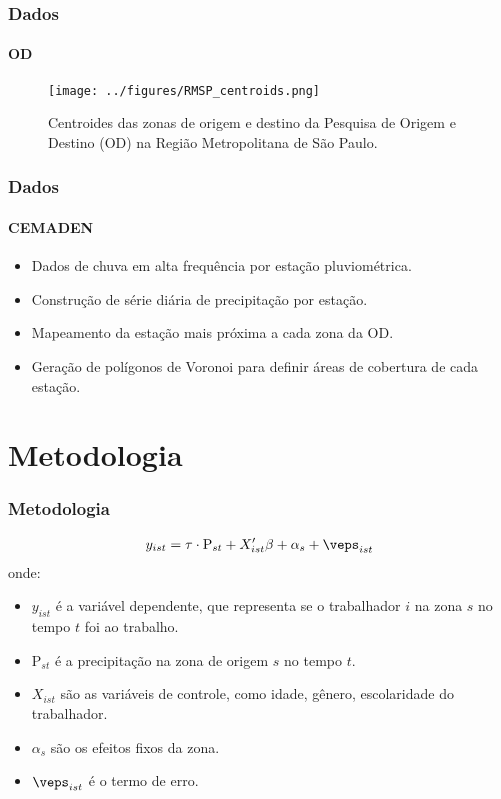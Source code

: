 \begin{frame}
    \frametitle{Dados}
    \framesubtitle{OD}
    \begin{figure}[H]
        \centering
        \texttt{[image: ../figures/RMSP\_centroids.png]}
        \caption{Centroides das zonas de origem e destino da Pesquisa de Origem e Destino (OD) na Região Metropolitana de São Paulo.}
        \label{fig:od_centroids}
    \end{figure} 
\end{frame}



\begin{frame}
    \frametitle{Dados}
    \framesubtitle{CEMADEN}
    \begin{itemize}
    \item Dados de chuva em alta frequência por estação pluviométrica.
    \item Construção de série diária de precipitação por estação.
    \item Mapeamento da estação mais próxima a cada zona da OD.
    \item Geração de polígonos de Voronoi para definir áreas de cobertura de cada estação.
    \end{itemize}
\end{frame}

\section{Metodologia}
\begin{frame}[plain]
    \frametitle{Metodologia}
    \begin{align*}
    y_{ist} &= \tau \cdot \text{P}_{st} + X_{ist}'\beta + \alpha_{s} + \veps_{ist} \\ 
    \end{align*}
    onde:
    \begin{itemize}
        \item $y_{ist}$ é a variável dependente, que representa se o trabalhador $i$ na zona $s$ no tempo $t$ foi ao trabalho.
        \item $\text{P}_{st}$ é a precipitação na zona de origem $s$ no tempo $t$.
        \item $X_{ist}$ são as variáveis de controle, como idade, gênero, escolaridade do trabalhador.
        \item $\alpha_{s}$ são os efeitos fixos da zona.
        \item $\veps_{ist}$ é o termo de erro.
    \end{itemize}
\end{frame}

